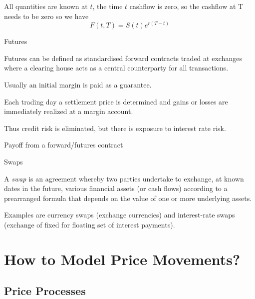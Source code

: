 All quantities are known at $t$, the time $t$ cashflow is zero, so the cashflow at T needs to be zero so we have $$F(t,T) = S(t)e^{r(T-t)}$$

{Futures}






	Futures can be defined as standardised forward contracts traded at exchanges where a clearing house acts as a central counterparty for all transactions.


	Usually an initial margin is paid as a guarantee.


	Each trading day a settlement price is determined and gains or losses are immediately realized at a margin account.


	Thus credit risk is eliminated, but there is exposure to interest rate risk.






{Payoff from a forward/futures contract}
\begin{figure}
  \centering
   \qquad
\end{figure}

{Swaps}






	
A {\it swap} is an agreement whereby two parties
undertake to exchange, at known dates in the future, various
financial assets (or cash flows) according to a prearranged
formula that depends on the value of one or more underlying
assets.


	
Examples are currency swaps (exchange currencies) and
interest-rate swaps (exchange of fixed for floating set of
interest payments).





\section{How to Model Price Movements?}
\subsection{Price Processes}

